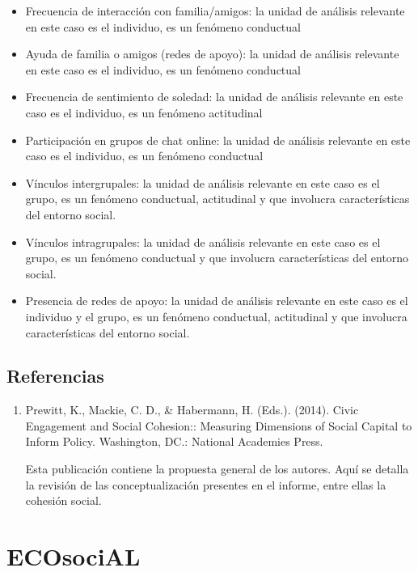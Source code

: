 \documentclass[
  12pt,
]{book}
\begin{document}
\begin{itemize}
\item
  Frecuencia de interacción con familia/amigos: la unidad de análisis
  relevante en este caso es el individuo, es un fenómeno conductual
\item
  Ayuda de familia o amigos (redes de apoyo): la unidad de análisis
  relevante en este caso es el individuo, es un fenómeno conductual
\item
  Frecuencia de sentimiento de soledad: la unidad de análisis
  relevante en este caso es el individuo, es un fenómeno actitudinal
\item
  Participación en grupos de chat online: la unidad de análisis
  relevante en este caso es el individuo, es un fenómeno conductual
\item
  Vínculos intergrupales: la unidad de análisis relevante en este caso
  es el grupo, es un fenómeno conductual, actitudinal y que involucra
  características del entorno social.
\item
  Vínculos intragrupales: la unidad de análisis relevante en este caso
  es el grupo, es un fenómeno conductual y que involucra
  características del entorno social.
\item
  Presencia de redes de apoyo: la unidad de análisis relevante en este
  caso es el individuo y el grupo, es un fenómeno conductual,
  actitudinal y que involucra características del entorno social.
\end{itemize}

\hypertarget{referencias-3}{%
\section{Referencias}\label{referencias-3}}

\begin{enumerate}
\def\labelenumi{\arabic{enumi}.}
\item
  Prewitt, K., Mackie, C. D., \& Habermann, H. (Eds.). (2014). Civic
  Engagement and Social Cohesion:: Measuring Dimensions of Social
  Capital to Inform Policy. Washington, DC.: National Academies
  Press.

  Esta publicación contiene la propuesta general de los autores. Aquí
  se detalla la revisión de las conceptualización presentes en el
  informe, entre ellas la cohesión social.
\end{enumerate}

\hypertarget{ecosocial}{%
\chapter{ECOsociAL}\label{ecosocial}}
\end{document}
